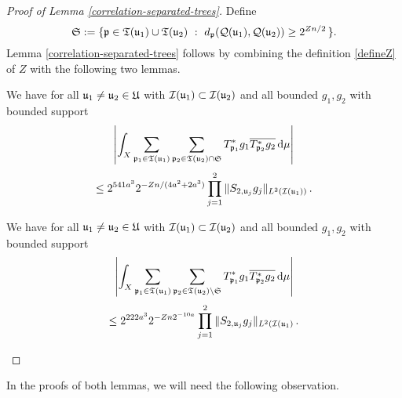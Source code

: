 {\begin{proof}[Proof of Lemma \ref{correlation-separated-trees}]
    Define
    \begin{equation}
        \label{def-Tree-S-set}
         \mathfrak{S} := \{\fp \in \fT(\fu_1) \cup \fT(\fu_2) \ : \ d_{\fp}(\fcc(\fu_1), \fcc(\fu_2)) \ge 2^{Zn/2}\,\}.
    \end{equation}
    Lemma \ref{correlation-separated-trees} follows by combining the definition \eqref{defineZ} of $Z$ with the following two lemmas.
    \begin{lemma}
        \label{correlation-distant-tree-parts}
        We have for all ${\mathfrak u}_1 \ne {\mathfrak u}_2 \in {\mathfrak U}$ with ${\mathcal{I}}({\mathfrak u}_1) \subset {\mathcal{I}}({\mathfrak u}_2)$ and all bounded $g_1, g_2$ with bounded support
        \begin{equation}
            \label{eq-lhs-big-sep-tree}
            \left| \int_X \sum_{{\mathfrak p}_1 \in {\mathfrak T}({\mathfrak u}_1)} \sum_{{\mathfrak p}_2 \in {\mathfrak T}({\mathfrak u}_2) \cap \mathfrak{S}} T^*_{{\mathfrak p}_1}g_1 \overline{T^*_{{\mathfrak p}_2}g_2 }\,\mathrm{d}\mu \right|
        \end{equation}
        \begin{equation}
            \label{eq-rhs-big-sep-tree}
            \le 2^{541a^3} 2^{-Zn/(4a^2 + 2a^3)} \prod_{j =1}^2 \| S_{2, {\mathfrak u}_j} g_j\|_{L^2({\mathcal{I}}({\mathfrak u}_1))}\,.
        \end{equation}
    \end{lemma}
    \begin{lemma}
        \label{correlation-near-tree-parts}
        We have for all ${\mathfrak u}_1 \ne {\mathfrak u}_2 \in {\mathfrak U}$ with ${\mathcal{I}}({\mathfrak u}_1) \subset {\mathcal{I}}({\mathfrak u}_2)$ and all bounded $g_1, g_2$ with bounded support
        \begin{equation}
            \label{eq-lhs-small-sep-tree}
            \left| \int_X \sum_{{\mathfrak p}_1 \in {\mathfrak T}({\mathfrak u}_1)} \sum_{{\mathfrak p}_2 \in {\mathfrak T}({\mathfrak u}_2) \setminus \mathfrak{S}} T^*_{{\mathfrak p}_1}g_1 \overline{T^*_{{\mathfrak p}_2}g_2 }\,\mathrm{d}\mu \right|
        \end{equation}
        \begin{equation}
            \label{eq-rhs-small-sep-tree}
            \le 2^{222a^3} 2^{-Zn 2^{-10a}} \prod_{j =1}^2 \| S_{2, {\mathfrak u}_j} g_j\|_{L^2({\mathcal{I}}({\mathfrak u}_1)}\,.
        \end{equation}
    \end{lemma}
\end{proof}

In the proofs of both lemmas, we will need the following observation.

}
